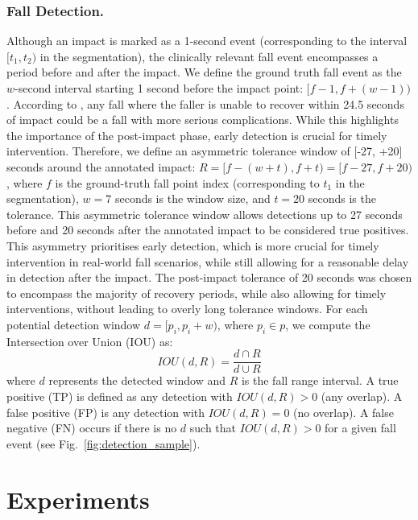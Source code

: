 \documentclass[runningheads]{llncs}
\begin{document}
\subsubsection{Fall Detection.} Although an impact is marked as a 1-second event (corresponding to the interval $[t_1, t_2)$ in the segmentation), the clinically relevant fall event encompasses a period before and after the impact. We define the ground truth fall event as the $w$-second interval starting 1 second before the impact point: $[f-1, f+(w-1))$. According to \cite{schwickert2017reading}, any fall where the faller is unable to recover within 24.5 seconds of impact could be a fall with more serious complications. While this highlights the importance of the post-impact phase, early detection is crucial for timely intervention. Therefore, we define an asymmetric tolerance window of [-27, +20] seconds around the annotated impact: $R = [f - (w + t), f + t) = [f - 27, f + 20)$, where $f$ is the ground-truth fall point index (corresponding to $t_1$ in the segmentation), $w = 7$ seconds is the window size, and $t=20$ seconds is the tolerance. This asymmetric tolerance window allows detections up to 27 seconds before and 20 seconds after the annotated impact to be considered true positives. This asymmetry prioritises early detection, which is more crucial for timely intervention in real-world fall scenarios, while still allowing for a reasonable delay in detection after the impact. The post-impact tolerance of 20 seconds was chosen to encompass the majority of recovery periods, while also allowing for timely interventions, without leading to overly long tolerance windows. For each potential detection window $d = [p_i, p_i + w)$, where $p_i \in p$, we compute the Intersection over Union (IOU) as:
\begin{equation}
    IOU(d, R) = \frac{{ d \cap R}}{d \cup R}
\end{equation} 
where $d$ represents the detected window and $R$ is the fall range interval. A true positive (TP) is defined as any detection with  $IOU(d, R)>0$ (any overlap). A false positive (FP) is any detection with  $IOU(d, R)=0$ (no overlap). A false negative (FN) occurs if there is no $d$ such that $IOU(d,R) > 0$ for a given fall event (see Fig.~\ref{fig:detection_sample}).

\section{Experiments}
\label{sec:experiments}
\end{document}
